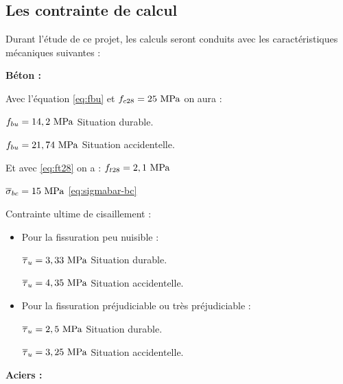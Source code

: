 \documentclass[12pt,a4paper]{report}
\numberwithin{equation}{section}
\newcommand{\sigmabar}[1]{\overline{\sigma}_{#1}}
\newcommand{\taubar}[1]{\overline{\tau}_{#1}}
\begin{document}
	
	
	
	\subsection{Les contrainte de calcul}
	
	Durant l’étude de ce projet, les calculs seront conduits avec les caractéristiques mécaniques
	suivantes :
	
	\vspace{\baselineskip}
	
	\textbf{Béton :}
	
	\vspace{\baselineskip}
	
	Avec l'équation \eqref{eq:fbu} et $f_{c28} = 25\mpa$ on aura :
	
	$f_{bu} = 14,2\mpa$ Situation durable.
	
	$f_{bu} = 21,74\mpa$ Situation accidentelle.
	
	\vspace{\baselineskip}
	
	Et avec \eqref{eq:ft28} on a : $f_{t28} = 2,1\mpa$
	
	\vspace{\baselineskip}
	
	$\sigmabar{bc} = 15\mpa$ \eqref{eq:sigmabar-bc}
	
	\vspace{\baselineskip}
	
	Contrainte ultime de cisaillement :
	
	\begin{itemize}
		\item Pour la fissuration peu nuisible :
		
		\subitem $\taubar{u} = 3,33\mpa$ Situation durable.
		
		\subitem $\taubar{u} = 4,35\mpa$ Situation accidentelle.
		
		\item Pour la fissuration préjudiciable ou très préjudiciable :
		
		\subitem $\taubar{u} = 2,5\mpa$ Situation durable.
		
		\subitem $\taubar{u} = 3,25\mpa$ Situation accidentelle.
		
		
	\end{itemize}
	
	\vspace{\baselineskip}
	
	\textbf{Aciers :}
	
\end{document}
